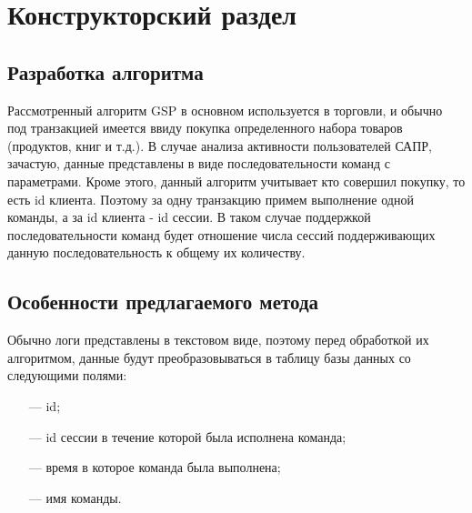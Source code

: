 \chapter{Конструкторский раздел}
\label{cha:design}

\section{Разработка алгоритма}
Рассмотренный алгоритм GSP в основном используется в торговли, и обычно под транзакцией имеется ввиду покупка определенного набора товаров (продуктов, книг и т.д.). В случае анализа активности пользователей САПР, зачастую, данные представлены в виде последовательности команд с параметрами. Кроме этого, данный алгоритм учитывает кто совершил покупку, то есть id клиента.
Поэтому за одну транзакцию примем выполнение одной команды, а за id клиента - id сессии. В таком случае поддержкой последовательности команд будет отношение числа сессий поддерживающих данную последовательность к общему их количеству. 

\section{Особенности предлагаемого метода}
Обычно логи представлены в текстовом виде, поэтому перед обработкой их алгоритмом, данные будут преобразовываться в таблицу базы данных со следующими полями:
\begin{itemize}
	\item[---] id; %
	\item[---] id сессии в течение которой была исполнена команда;
	\item[---] время в которое команда была выполнена;
	\item[---] имя команды.
\end{itemize}

